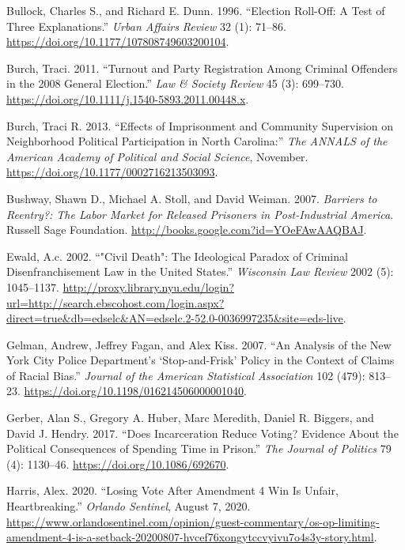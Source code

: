 \documentclass[
  12pt,
]{article}
\newlength{\cslhangindent}
\newenvironment{cslreferences}%
  {\setlength{\parindent}{0pt}%
  \everypar{\setlength{\hangindent}{\cslhangindent}}\ignorespaces}%
  {\par}
\begin{document}
\begin{cslreferences}
\leavevmode\hypertarget{ref-Bullock1996}{}%
Bullock, Charles S., and Richard E. Dunn. 1996. ``Election Roll-Off: A Test of Three Explanations.'' \emph{Urban Affairs Review} 32 (1): 71--86. \url{https://doi.org/10.1177/107808749603200104}.

\leavevmode\hypertarget{ref-Burch2011}{}%
Burch, Traci. 2011. ``Turnout and Party Registration Among Criminal Offenders in the 2008 General Election.'' \emph{Law \& Society Review} 45 (3): 699--730. \url{https://doi.org/10.1111/j.1540-5893.2011.00448.x}.

\leavevmode\hypertarget{ref-Burch2013}{}%
Burch, Traci R. 2013. ``Effects of Imprisonment and Community Supervision on Neighborhood Political Participation in North Carolina:'' \emph{The ANNALS of the American Academy of Political and Social Science}, November. \url{https://doi.org/10.1177/0002716213503093}.

\leavevmode\hypertarget{ref-Bushway2007}{}%
Bushway, Shawn D., Michael A. Stoll, and David Weiman. 2007. \emph{Barriers to Reentry?: The Labor Market for Released Prisoners in Post-Industrial America}. Russell Sage Foundation. \url{http://books.google.com?id=YOeFAwAAQBAJ}.

\leavevmode\hypertarget{ref-Ewald2002}{}%
Ewald, A.c. 2002. ``"Civil Death": The Ideological Paradox of Criminal Disenfranchisement Law in the United States.'' \emph{Wisconsin Law Review} 2002 (5): 1045--1137. \url{http://proxy.library.nyu.edu/login?url=http://search.ebscohost.com/login.aspx?direct=true\&db=edselc\&AN=edselc.2-52.0-0036997235\&site=eds-live}.

\leavevmode\hypertarget{ref-Gelman2007}{}%
Gelman, Andrew, Jeffrey Fagan, and Alex Kiss. 2007. ``An Analysis of the New York City Police Department's `Stop-and-Frisk' Policy in the Context of Claims of Racial Bias.'' \emph{Journal of the American Statistical Association} 102 (479): 813--23. \url{https://doi.org/10.1198/016214506000001040}.

\leavevmode\hypertarget{ref-Gerber2017}{}%
Gerber, Alan S., Gregory A. Huber, Marc Meredith, Daniel R. Biggers, and David J. Hendry. 2017. ``Does Incarceration Reduce Voting? Evidence About the Political Consequences of Spending Time in Prison.'' \emph{The Journal of Politics} 79 (4): 1130--46. \url{https://doi.org/10.1086/692670}.

\leavevmode\hypertarget{ref-Harris2020}{}%
Harris, Alex. 2020. ``Losing Vote After Amendment 4 Win Is Unfair, Heartbreaking.'' \emph{Orlando Sentinel}, August 7, 2020. \url{https://www.orlandosentinel.com/opinion/guest-commentary/os-op-limiting-amendment-4-is-a-setback-20200807-hvcef76xongytccvyivu7o4s3y-story.html}.


\end{cslreferences}
\end{document}
